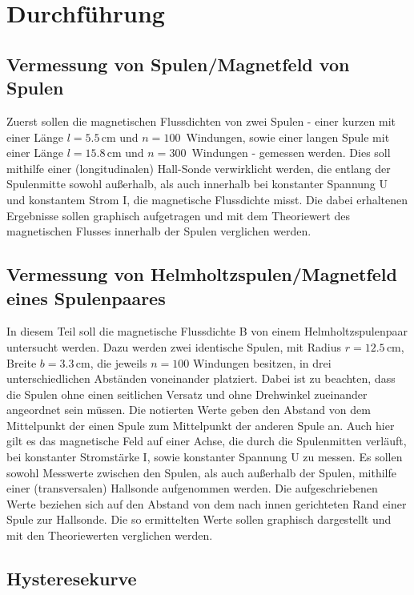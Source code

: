 \section{Durchführung}
\label{sec:Durchführung}

\subsection{Vermessung von Spulen/Magnetfeld von Spulen}

Zuerst sollen die magnetischen Flussdichten von zwei Spulen - einer kurzen mit einer Länge 
$l = 5.5\, \si{\centi\meter}$ und $n = 100\,$ Windungen, sowie einer langen Spule mit einer Länge
$l = 15.8\, \si{\cm}$ und $n = 300\,$ Windungen - gemessen werden. Dies soll mithilfe einer
(longitudinalen) Hall-Sonde verwirklicht werden, die entlang der Spulenmitte sowohl außerhalb, als auch
innerhalb bei konstanter Spannung U und konstantem Strom I, die magnetische Flussdichte misst.
Die dabei erhaltenen Ergebnisse sollen graphisch aufgetragen und mit dem Theoriewert des magnetischen Flusses
innerhalb der Spulen verglichen werden.

\subsection{Vermessung von Helmholtzspulen/Magnetfeld eines Spulenpaares}

In diesem Teil soll die magnetische Flussdichte B von einem Helmholtzspulenpaar untersucht werden.
Dazu werden zwei identische Spulen, mit Radius $r = 12.5\, \si{\cm}$, Breite $b = 3.3\, \si{\centi\meter}$, die
jeweils $n = 100$ Windungen besitzen, in drei unterschiedlichen Abständen voneinander platziert. Dabei ist zu beachten,
dass die Spulen ohne einen seitlichen Versatz und ohne Drehwinkel zueinander angeordnet sein müssen.
Die notierten Werte geben den Abstand von dem Mittelpunkt der einen Spule zum Mittelpunkt der anderen Spule an. 
Auch hier gilt es das magnetische Feld auf einer Achse, die durch die Spulenmitten verläuft, bei konstanter
Stromstärke I, sowie konstanter Spannung U zu messen. Es sollen sowohl Messwerte zwischen den Spulen, als auch 
außerhalb der Spulen, mithilfe einer (transversalen) Hallsonde aufgenommen werden. Die aufgeschriebenen 
Werte beziehen sich auf den Abstand von dem nach innen gerichteten Rand einer Spule zur Hallsonde.
Die so ermittelten Werte sollen graphisch dargestellt und mit den Theoriewerten verglichen werden.

\subsection{Hysteresekurve}

